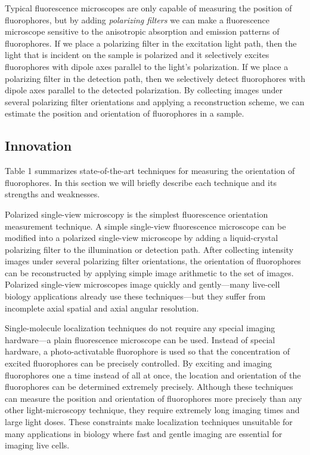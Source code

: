 \documentclass[11pt]{article}
\begin{document}
Typical fluorescence microscopes are only capable of measuring the position of
fluorophores, but by adding \textit{polarizing filters} we can make a
fluorescence microscope sensitive to the anisotropic absorption and emission
patterns of fluorophores. If we place a polarizing filter in the excitation
light path, then the light that is incident on the sample is polarized and it
selectively excites fluorophores with dipole axes parallel to the light's
polarization. If we place a polarizing filter in the detection path, then we
selectively detect fluorophores with dipole axes parallel to the detected
polarization. By collecting images under several polarizing filter orientations
and applying a reconstruction scheme, we can estimate the position and
orientation of fluorophores in a sample.

\subsection*{Innovation}
Table 1 summarizes state-of-the-art techniques for measuring the orientation of
fluorophores. In this section we will briefly describe each technique and its
strengths and weaknesses. 

Polarized single-view microscopy \cite{demay2011} is the simplest fluorescence
orientation measurement technique. A simple single-view fluorescence microscope
can be modified into a polarized single-view microscope by adding a
liquid-crystal polarizing filter to the illumination or detection path. After
collecting intensity images under several polarizing filter orientations, the
orientation of fluorophores can be reconstructed by applying simple image
arithmetic to the set of images. Polarized single-view microscopes image quickly
and gently---many live-cell biology applications already use these
techniques---but they suffer from incomplete axial spatial and axial angular
resolution.

Single-molecule localization techniques do not require any special imaging
hardware---a plain fluorescence microscope can be used. Instead of special
hardware, a photo-activatable fluorophore is used so that the concentration of
excited fluorophores can be precisely controlled. By exciting and imaging
fluorophores one a time instead of all at once, the location and orientation of
the fluorophores can be determined extremely precisely. Although these techniques
can measure the position and orientation of fluorophores more precisely than any
other light-microscopy technique, they require extremely long imaging times and
large light doses. These constraints make localization techniques unsuitable for
many applications in biology where fast and gentle imaging are essential for
imaging live cells.
\end{document}
